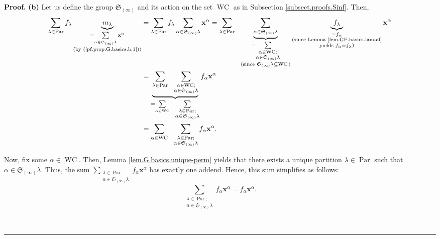 \documentclass[numbers=enddot,12pt,final,onecolumn,notitlepage]{scrartcl}%
\theoremstyle{definition}
\newenvironment{proof}[1][Proof]{\noindent\textbf{#1.} }{\ \rule{0.5em}{0.5em}}
\let\sumnonlimits\sum
\renewcommand{\sum}{\sumnonlimits\limits}
\newenvironment{verlong}{}{}
\begin{document}
\begin{verlong}
\begin{proof}
\textbf{(b)} Let us define the group $\mathfrak{S}_{\left(  \infty\right)  }$
and its action on the set $\operatorname*{WC}$ as in Subsection
\ref{subsect.proofs.Sinf}. Then,%
\begin{align}
\sum_{\lambda\in\operatorname*{Par}}f_{\lambda}\underbrace{m_{\lambda}%
}_{\substack{=\sum_{\alpha\in\mathfrak{S}_{\left(  \infty\right)  }\lambda
}\mathbf{x}^{\alpha}\\\text{(by (\ref{pf.prop.G.basics.b.1}))}}}  &
=\sum_{\lambda\in\operatorname*{Par}}f_{\lambda}\sum_{\alpha\in\mathfrak{S}%
_{\left(  \infty\right)  }\lambda}\mathbf{x}^{\alpha}=\sum_{\lambda
\in\operatorname*{Par}}\ \ \underbrace{\sum_{\alpha\in\mathfrak{S}_{\left(
\infty\right)  }\lambda}}_{\substack{=\sum_{\substack{\alpha\in
\operatorname*{WC};\\\alpha\in\mathfrak{S}_{\left(  \infty\right)  }\lambda
}}\\\text{(since }\mathfrak{S}_{\left(  \infty\right)  }\lambda\subseteq
\operatorname*{WC}\text{)}}}\underbrace{f_{\lambda}}_{\substack{=f_{\alpha
}\\\text{(since Lemma \ref{lem.GF.basics.lam-al}}\\\text{yields }f_{\alpha
}=f_{\lambda}\text{)}}}\mathbf{x}^{\alpha}\nonumber\\
&  =\underbrace{\sum_{\lambda\in\operatorname*{Par}}\ \ \sum_{\substack{\alpha
\in\operatorname*{WC};\\\alpha\in\mathfrak{S}_{\left(  \infty\right)  }%
\lambda}}}_{=\sum_{\alpha\in\operatorname*{WC}}\ \ \sum_{\substack{\lambda
\in\operatorname*{Par};\\\alpha\in\mathfrak{S}_{\left(  \infty\right)
}\lambda}}}f_{\alpha}\mathbf{x}^{\alpha}\nonumber\\
&  =\sum_{\alpha\in\operatorname*{WC}}\ \ \sum_{\substack{\lambda
\in\operatorname*{Par};\\\alpha\in\mathfrak{S}_{\left(  \infty\right)
}\lambda}}f_{\alpha}\mathbf{x}^{\alpha}. \label{pf.prop.GF.basics.b.new2}%
\end{align}


Now, fix some $\alpha\in\operatorname*{WC}$. Then, Lemma
\ref{lem.G.basics.unique-perm} yields that there exists a unique partition
$\lambda\in\operatorname*{Par}$ such that $\alpha\in\mathfrak{S}_{\left(
\infty\right)  }\lambda$. Thus, the sum $\sum_{\substack{\lambda
\in\operatorname*{Par};\\\alpha\in\mathfrak{S}_{\left(  \infty\right)
}\lambda}}f_{\alpha}\mathbf{x}^{\alpha}$ has exactly one addend. Hence, this
sum simplifies as follows:%
\begin{equation}
\sum_{\substack{\lambda\in\operatorname*{Par};\\\alpha\in\mathfrak{S}_{\left(
\infty\right)  }\lambda}}f_{\alpha}\mathbf{x}^{\alpha}=f_{\alpha}%
\mathbf{x}^{\alpha}. \label{pf.prop.GF.basics.b.new3}%
\end{equation}



\end{proof}
\end{verlong}
\end{document}
